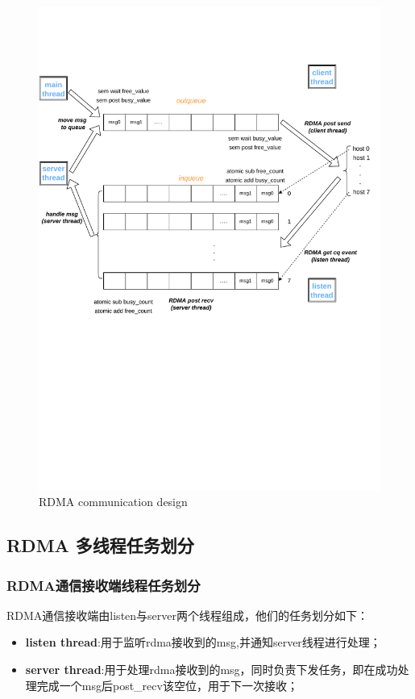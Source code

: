 {    \begin{figure}[H]
        \centering
        \includegraphics[width=1.1\textwidth]{Img/RDMA_design.pdf}
        \caption{RDMA communication design}
    \end{figure}


    \subsection{RDMA 多线程任务划分}

    \subsubsection{RDMA通信接收端线程任务划分}
    RDMA通信接收端由listen与server两个线程组成，他们的任务划分如下：

    \begin{itemize}[leftmargin=*, nosep]
        \item \textbf{listen thread}:用于监听rdma接收到的msg,并通知server线程进行处理；
        \item \textbf{server thread}:用于处理rdma接收到的msg，同时负责下发任务，即在成功处理完成一个msg后post\_recv该空位，用于下一次接收；
    \end{itemize}

}
